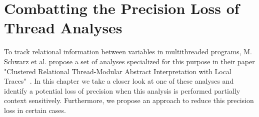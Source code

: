
\chapter{Combatting the Precision Loss of Thread Analyses}\label{chapter:precisionLossThreadAnalyses}
  To track relational information between variables in multithreaded programs, M. Schwarz et al. propose a set of analyses specialized for this purpose in their paper "Clustered Relational Thread-Modular Abstract Interpretation with Local Traces"~\parencite{schwarz2023clustered}. In this chapter we take a closer look at one of these analyses and identify a potential loss of precision when this analysis is performed partially context sensitively. Furthermore, we propose an approach to reduce this precision loss in certain cases.
